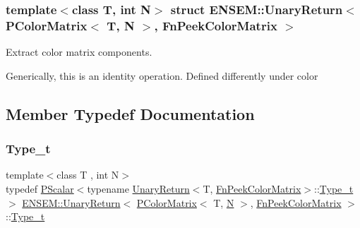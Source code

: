 \subsubsection*{template$<$class T, int N$>$\newline
struct E\+N\+S\+E\+M\+::\+Unary\+Return$<$ P\+Color\+Matrix$<$ T, N $>$, Fn\+Peek\+Color\+Matrix $>$}

Extract color matrix components. 

Generically, this is an identity operation. Defined differently under color 

\subsection{Member Typedef Documentation}
\mbox{\label{structENSEM_1_1UnaryReturn_3_01PColorMatrix_3_01T_00_01N_01_4_00_01FnPeekColorMatrix_01_4_ab57f89c629e14031c8ea8f4215b52543}} 
\subsubsection{\texorpdfstring{Type\_t}{Type\_t}\hspace{0.1cm}{\footnotesize\ttfamily [1/2]}}
{\footnotesize\ttfamily template$<$class T , int N$>$ \\
typedef \mbox{\hyperlink{classENSEM_1_1PScalar}{P\+Scalar}}$<$typename \mbox{\hyperlink{structENSEM_1_1UnaryReturn}{Unary\+Return}}$<$T, \mbox{\hyperlink{structENSEM_1_1FnPeekColorMatrix}{Fn\+Peek\+Color\+Matrix}}$>$\+::\mbox{\hyperlink{structENSEM_1_1UnaryReturn_3_01PColorMatrix_3_01T_00_01N_01_4_00_01FnPeekColorMatrix_01_4_ab57f89c629e14031c8ea8f4215b52543}{Type\+\_\+t}}$>$ \mbox{\hyperlink{structENSEM_1_1UnaryReturn}{E\+N\+S\+E\+M\+::\+Unary\+Return}}$<$ \mbox{\hyperlink{classENSEM_1_1PColorMatrix}{P\+Color\+Matrix}}$<$ T, \mbox{\hyperlink{operator__name__util_8cc_a7722c8ecbb62d99aee7ce68b1752f337}{N}} $>$, \mbox{\hyperlink{structENSEM_1_1FnPeekColorMatrix}{Fn\+Peek\+Color\+Matrix}} $>$\+::\mbox{\hyperlink{structENSEM_1_1UnaryReturn_3_01PColorMatrix_3_01T_00_01N_01_4_00_01FnPeekColorMatrix_01_4_ab57f89c629e14031c8ea8f4215b52543}{Type\+\_\+t}}}

